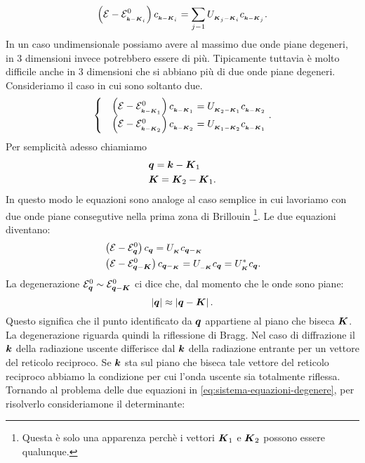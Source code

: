 \[
	\left( \mathcal{E}-\mathcal{E}^0_{_{\boldsymbol{k}-\boldsymbol{K}_i}} \right) 
	c_{_{\boldsymbol{k}-\boldsymbol{K}_i}} 
	=
	\sum_{j-1}^{} U_{_{\boldsymbol{K}_j-\boldsymbol{K}_i}}c_{_{\boldsymbol{k}-\boldsymbol{K}_j}}
.\] 
In un caso undimensionale possiamo avere al massimo due onde piane degeneri, in 3 dimensioni invece potrebbero essere di più. Tipicamente tuttavia è molto difficile anche in 3 dimensioni che si abbiano più di due onde piane degeneri. Consideriamo il caso in cui sono soltanto due.
\[
	\begin{cases}
		&\left(\mathcal{E}-\mathcal{E}^0_{_{\boldsymbol{k}-\boldsymbol{K}_1}} \right) 
		c_{_{\boldsymbol{k}-\boldsymbol{K}_1}} 
		=
		U_{_{\boldsymbol{K}_2-\boldsymbol{K}_1}}c_{_{\boldsymbol{k}-\boldsymbol{K}_2}} \\
		&\left(\mathcal{E}-\mathcal{E}^0_{_{\boldsymbol{k}-\boldsymbol{K}_2}} \right) 
		c_{_{\boldsymbol{k}-\boldsymbol{K}_2}} 
		=
		U_{_{\boldsymbol{K}_1-\boldsymbol{K}_2}}c_{_{\boldsymbol{k}-\boldsymbol{K}_1}} 
	\end{cases}
.\] 
Per semplicità adesso chiamiamo 
\[\begin{aligned}
	&\boldsymbol{q} = \boldsymbol{k}-\boldsymbol{K}_1\\
	&\boldsymbol{K} = \boldsymbol{K}_2-\boldsymbol{K}_1 
.\end{aligned}\]
In questo modo le equazioni sono analoge al caso semplice in cui lavoriamo con due onde piane consegutive nella prima zona di Brillouin \footnote{Questa è solo una apparenza perchè i vettori $\boldsymbol{K}_1$ e $\boldsymbol{K}_2$ possono essere qualunque.}. Le due equazioni diventano:
\[\begin{aligned}
	&\left( \mathcal{E}-\mathcal{E}^0_{\boldsymbol{q}} \right) c_{\boldsymbol{q}}
	=
	U_{_{\boldsymbol{K}}}c_{\boldsymbol{q}-_{\boldsymbol{K}}}\\
	&\left( \mathcal{E}-\mathcal{E}^0_{\boldsymbol{q}-\boldsymbol{K}} \right) c_{\boldsymbol{q}-_{\boldsymbol{K}}}
	=
	U_{_{-\boldsymbol{K}}}c_{\boldsymbol{q}} = U^*_{_{\boldsymbol{K}}}c_{\boldsymbol{q}}
	\label{eq:sistema-equazioni-degenere}
.\end{aligned}\]	
La degenerazione $\mathcal{E}^0_{\boldsymbol{q}}\sim \mathcal{E}^0_{\boldsymbol{q}-\boldsymbol{K}}$ ci dice che, dal momento che le onde sono piane:
\[
	\left| \boldsymbol{q} \right| \approx \left| \boldsymbol{q}-\boldsymbol{K} \right| 
.\] 
Questo significa che il punto identificato da $\boldsymbol{q}$ appartiene al piano che biseca $\boldsymbol{K}$. \\
La degenerazione riguarda quindi la riflessione di Bragg. Nel caso di diffrazione il $\boldsymbol{k}$ della radiazione uscente differisce dal $\boldsymbol{k}$ della radiazione entrante per un vettore del reticolo reciproco. Se $\boldsymbol{k}$ sta sul piano che biseca tale vettore del reticolo reciproco abbiamo la condizione per cui l'onda uscente sia totalmente riflessa.\\
Tornando al problema delle due equazioni in \ref{eq:sistema-equazioni-degenere}, per risolverlo consideriamone il determinante:
